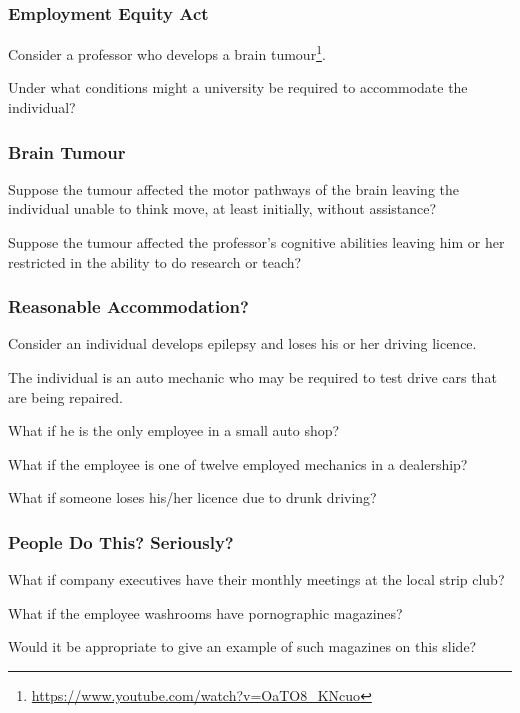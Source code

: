 \begin{frame}
\frametitle{Employment Equity Act}

Consider a professor who develops a brain tumour\footnote{\url{https://www.youtube.com/watch?v=OaTO8_KNcuo}}.

Under what conditions might a university be required to accommodate the individual?

\end{frame}



\begin{frame}
\frametitle{Brain Tumour}

Suppose the tumour affected the motor pathways of the brain leaving the individual unable to think move, at least initially, without assistance?

Suppose the tumour affected the professor's cognitive abilities leaving him or her restricted in the ability to do research or teach?

\end{frame}



\begin{frame}
\frametitle{Reasonable Accommodation?}

Consider an individual develops epilepsy and loses his or her driving licence.

The individual is an auto mechanic who may be required to test drive cars that are being repaired.

What if he is the only employee in a small auto shop?

What if the employee is one of twelve employed mechanics in a dealership?

What if someone loses his/her licence due to drunk driving?

\end{frame}



\begin{frame}
\frametitle{People Do This? Seriously?}

What if company executives have their monthly meetings at the local strip club?

What if the employee washrooms have pornographic magazines?

Would it be appropriate to give an example of such magazines on this slide?

\end{frame}



